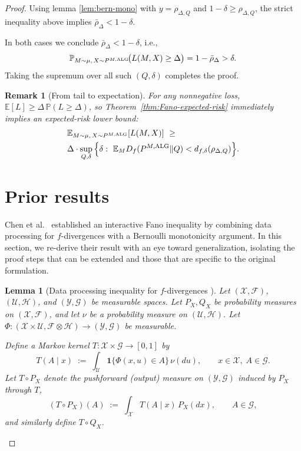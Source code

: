 \documentclass[conference]{IEEEtran}
\newtheorem{remark}{Remark}
\newtheorem{lemma}{Lemma}
\begin{document}
\begin{proof}[Proof]
Using lemma \ref{lem:bern-mono} with $y=\rho_{\Delta,Q}$ and $1-\delta\ge \rho_{\Delta,Q}$, the strict inequality above implies
$\bar\rho_\Delta < 1-\delta$.

In both cases we conclude $\bar\rho_\Delta<1-\delta$, i.e.,
\[
\mathbb P_{M\sim\mu,\,X\sim P^{M,\textup{ALG}}}\!\big(L(M,X)\ge \Delta\big)=1-\bar\rho_\Delta>\delta.
\]
Taking the supremum over all such $(Q,\delta)$ completes the proof.


\begin{remark}[From tail to expectation]
For any nonnegative loss, $\mathbb{E}[L]\ge \Delta\,\mathbb P(L\ge \Delta)$, so Theorem~\ref{thm:Fano-expected-risk}
immediately implies an \emph{expected-risk} lower bound:
\[
\begin{aligned}
&\mathbb{E}_{M\sim\mu,\,X\sim P^{M,\textup{ALG}}}[L(M,X)]
\ \ge\
\\
&\Delta\cdot
\sup_{Q,\delta}\Big\{\delta:\ \mathbb{E}_M D_f(P^{M,\textup{ALG}}\|Q)< d_{f,\delta}(\rho_{\Delta,Q})\Big\}.
\end{aligned}
\]
\end{remark}
\fi
\iffalse
\section{Prior results}
Chen et al.~\cite{chen2024assouad} established an interactive Fano inequality by combining data processing for \(f\)-divergences with a Bernoulli monotonicity argument. In this section, we re-derive their result with an eye toward generalization, isolating the proof steps that can be extended and those that are specific to the original formulation.


\begin{lemma}[Data processing inequality for \(f\)-divergences \cite{polyanskiy2025information}]\label{lem:dpi-f}
Let \((\mathcal X,\mathcal F)\), \((\mathcal U,\mathcal H)\), and \((\mathcal Y,\mathcal G)\) be measurable spaces.
Let \(P_X,Q_X\) be probability measures on \((\mathcal X,\mathcal F)\), and let \(\nu\) be a probability measure on \((\mathcal U,\mathcal H)\).
Let \(\Phi:(\mathcal X\times\mathcal U,\mathcal F\otimes\mathcal H)\to(\mathcal Y,\mathcal G)\) be measurable.

Define a Markov kernel \(T:\mathcal X\times\mathcal G\to[0,1]\) by
\[
T(A\mid x)\;:=\;\int_{\mathcal U}\mathbf 1\{\Phi(x,u)\in A\}\,\nu(du),
\qquad x\in\mathcal X,\; A\in\mathcal G.
\]
Let \(T\circ P_X\) denote the pushforward (output) measure on \((\mathcal Y,\mathcal G)\) induced by \(P_X\) through \(T\),
\[
(T\circ P_X)(A)\;:=\;\int_{\mathcal X}T(A\mid x)\,P_X(dx),\qquad A\in\mathcal G,
\]
and similarly define \(T\circ Q_X\).


\end{lemma}
\end{proof}
\end{document}
